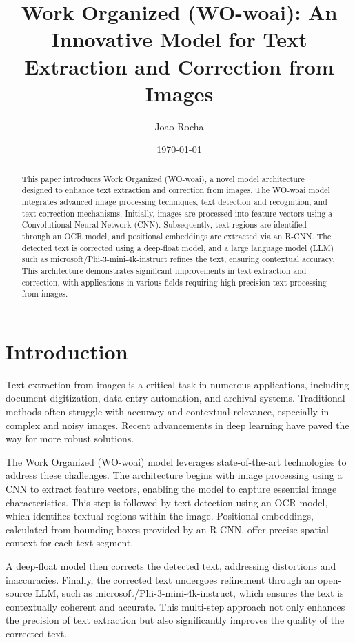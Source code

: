\documentclass{article}
\title{Work Organized (WO-woai): An Innovative Model for Text Extraction and Correction from Images}
\author{Joao Rocha}
\date{\today}
\begin{document}
\maketitle

\begin{abstract}
This paper introduces Work Organized (WO-woai), a novel model architecture designed to enhance text extraction and correction from images. The WO-woai model integrates advanced image processing techniques, text detection and recognition, and text correction mechanisms. Initially, images are processed into feature vectors using a Convolutional Neural Network (CNN). Subsequently, text regions are identified through an OCR model, and positional embeddings are extracted via an R-CNN. The detected text is corrected using a deep-float model, and a large language model (LLM) such as microsoft/Phi-3-mini-4k-instruct refines the text, ensuring contextual accuracy. This architecture demonstrates significant improvements in text extraction and correction, with applications in various fields requiring high precision text processing from images.
\end{abstract}

\section{Introduction}
Text extraction from images is a critical task in numerous applications, including document digitization, data entry automation, and archival systems. Traditional methods often struggle with accuracy and contextual relevance, especially in complex and noisy images. Recent advancements in deep learning have paved the way for more robust solutions.

The Work Organized (WO-woai) model leverages state-of-the-art technologies to address these challenges. The architecture begins with image processing using a CNN to extract feature vectors, enabling the model to capture essential image characteristics. This step is followed by text detection using an OCR model, which identifies textual regions within the image. Positional embeddings, calculated from bounding boxes provided by an R-CNN, offer precise spatial context for each text segment.

A deep-float model then corrects the detected text, addressing distortions and inaccuracies. Finally, the corrected text undergoes refinement through an open-source LLM, such as microsoft/Phi-3-mini-4k-instruct, which ensures the text is contextually coherent and accurate. This multi-step approach not only enhances the precision of text extraction but also significantly improves the quality of the corrected text.
\end{document}
